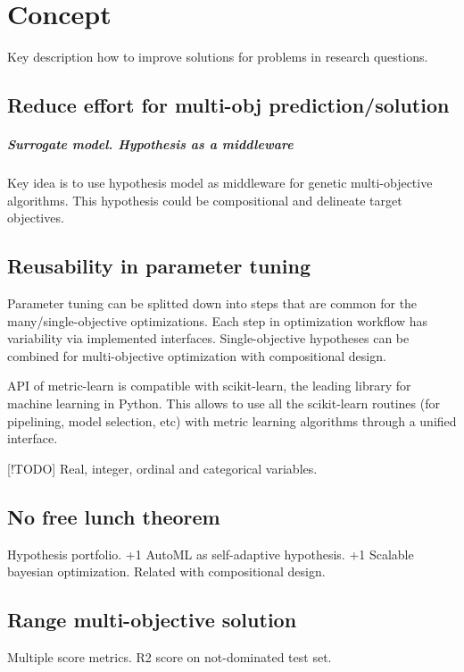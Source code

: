 \chapter{Concept}
Key description how to improve solutions for problems in research questions.

    \section{Reduce effort for multi-obj prediction/solution}
        \paragraph{Surrogate model. Hypothesis as a middleware}
        Key idea is to use hypothesis model as middleware for genetic multi-objective algorithms.
        This hypothesis could be compositional and delineate target objectives. 

    \section{Reusability in parameter tuning}
        Parameter tuning can be splitted down into steps that are common for the many/single-objective optimizations. 
        Each step in optimization workflow has variability via implemented interfaces.
        Single-objective hypotheses can be combined for multi-objective optimization with compositional design.

        API of metric-learn is compatible with scikit-learn, the leading library for machine learning in Python. 
        This allows to use all the scikit-learn routines (for pipelining, model selection, etc) with metric learning algorithms through a unified interface.

        [!TODO] Real, integer, ordinal and categorical variables.

    \section{No free lunch theorem}
        Hypothesis portfolio. +1 AutoML as self-adaptive hypothesis. +1 Scalable bayesian optimization. Related with compositional design.

    \section{Range multi-objective solution}
        Multiple score metrics. R2 score on not-dominated test set.

